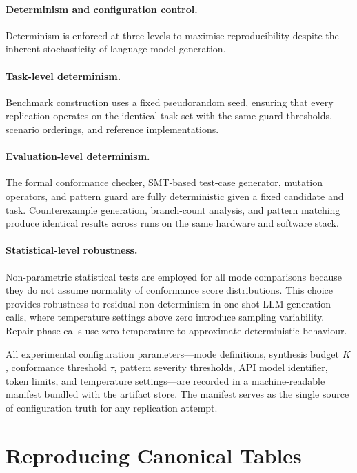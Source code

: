 \paragraph{Determinism and configuration control.}
Determinism is enforced at three levels to maximise reproducibility despite
the inherent stochasticity of language-model generation.

\paragraph{Task-level determinism.}
Benchmark construction uses a fixed pseudorandom seed, ensuring that every
replication operates on the identical task set with the same guard thresholds,
scenario orderings, and reference implementations.

\paragraph{Evaluation-level determinism.}
The formal conformance checker, SMT-based test-case generator, mutation
operators, and pattern guard are fully deterministic given a fixed candidate
and task.  Counterexample generation, branch-count analysis, and pattern
matching produce identical results across runs on the same hardware and
software stack.

\paragraph{Statistical-level robustness.}
Non-parametric statistical tests are employed for all mode comparisons because
they do not assume normality of conformance score distributions.  This choice
provides robustness to residual non-determinism in one-shot LLM generation
calls, where temperature settings above zero introduce sampling variability.
Repair-phase calls use zero temperature to approximate deterministic behaviour.

All experimental configuration parameters---mode definitions, synthesis budget
$K$, conformance threshold $\tau$, pattern severity thresholds, API model
identifier, token limits, and temperature settings---are recorded in a
machine-readable manifest bundled with the artifact store.  The manifest serves
as the single source of configuration truth for any replication attempt.

\section{Reproducing Canonical Tables}
\label{sec:repro:canonical-tables}


